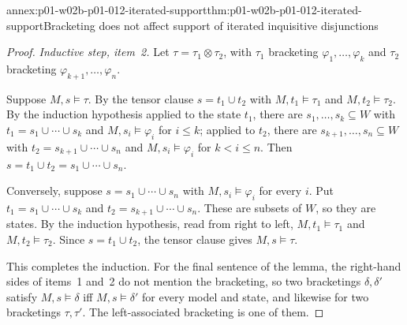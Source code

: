 \begin{annexitem}{annex:p01-w02b-p01-012-iterated-support}{thm:p01-w02b-p01-012-iterated-support}{Bracketing does not affect support of iterated inquisitive disjunctions}
\begin{proof}
\emph{Inductive step, item~2.}  Let \(\tau=\tau_1\otimes\tau_2\), with
\(\tau_1\) bracketing \(\varphi_1,\ldots,\varphi_k\) and \(\tau_2\)
bracketing \(\varphi_{k+1},\ldots,\varphi_n\).

Suppose \(M,s\models\tau\).  By the tensor clause \(s=t_1\cup t_2\) with
\(M,t_1\models\tau_1\) and \(M,t_2\models\tau_2\).  By the induction
hypothesis applied to the state \(t_1\), there are
\(s_1,\ldots,s_k\subseteq W\) with \(t_1=s_1\cup\cdots\cup s_k\) and
\(M,s_i\models\varphi_i\) for \(i\leq k\); applied to \(t_2\), there are
\(s_{k+1},\ldots,s_n\subseteq W\) with \(t_2=s_{k+1}\cup\cdots\cup s_n\)
and \(M,s_i\models\varphi_i\) for \(k<i\leq n\).  Then
\(s=t_1\cup t_2=s_1\cup\cdots\cup s_n\).

Conversely, suppose \(s=s_1\cup\cdots\cup s_n\) with
\(M,s_i\models\varphi_i\) for every \(i\).  Put
\(t_1=s_1\cup\cdots\cup s_k\) and \(t_2=s_{k+1}\cup\cdots\cup s_n\).
These are subsets of \(W\), so they are states.  By the induction
hypothesis, read from right to left, \(M,t_1\models\tau_1\) and
\(M,t_2\models\tau_2\).  Since \(s=t_1\cup t_2\), the tensor clause gives
\(M,s\models\tau\).

This completes the induction.  For the final sentence of the lemma, the
right-hand sides of items~1 and~2 do not mention the bracketing, so two
bracketings \(\delta,\delta'\) satisfy \(M,s\models\delta\) iff
\(M,s\models\delta'\) for every model and state, and likewise for two
bracketings \(\tau,\tau'\).  The left-associated bracketing is one of
them.
\end{proof}
\end{annexitem}

